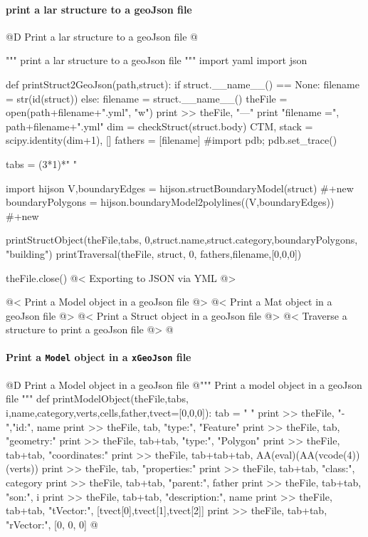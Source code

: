 \documentclass[11pt,oneside]{article}	%
\begin{document}
\paragraph{print a lar structure to a geoJson file}

@D Print a lar structure to a geoJson file
@{""" print a lar structure to a geoJson file """
import yaml
import json

	

def printStruct2GeoJson(path,struct):
	if struct.__name__() == None:
		filename = str(id(struct))
	else: 
		filename = struct.__name__()
	theFile = open(path+filename+".yml", "w")
	print >> theFile, "---"
	print "filename =", path+filename+".yml"
	dim = checkStruct(struct.body)
	CTM, stack = scipy.identity(dim+1), []
	fathers = [filename]
	#import pdb; pdb.set_trace()

	tabs = (3*1)*" "

	import hijson
	V,boundaryEdges = hijson.structBoundaryModel(struct)   #+new
	boundaryPolygons = hijson.boundaryModel2polylines((V,boundaryEdges))  #+new
	
	printStructObject(theFile,tabs, 0,struct.name,struct.category,boundaryPolygons, "building")
	printTraversal(theFile, struct, 0, fathers,filename,[0,0,0]) 

	theFile.close()
	@< Exporting to JSON via YML @>

@< Print a Model object in a geoJson file @>
@< Print a Mat object in a geoJson file @>
@< Print a Struct object in a geoJson file @>
@< Traverse a structure to print a geoJson file @>
@}

\paragraph{Print a \texttt{Model} object in a \texttt{xGeoJson} file}
	
@D Print a Model object in a geoJson file
@{""" Print a model object in a geoJson file """
def printModelObject(theFile,tabs, i,name,category,verts,cells,father,tvect=[0,0,0]):
	tab = "	"
	print >> theFile, "-   ","id:", name
	print >> theFile, tab, "type:", "Feature"
	print >> theFile, tab, "geometry:" 
	print >> theFile, tab+tab, "type:", "Polygon"
	print >> theFile, tab+tab, "coordinates:" 
	print >> theFile, tab+tab+tab, AA(eval)(AA(vcode(4))(verts))
	print >> theFile, tab, "properties:"
	print >> theFile, tab+tab, "class:", category
	print >> theFile, tab+tab, "parent:", father
	print >> theFile, tab+tab, "son:", i
	print >> theFile, tab+tab, "description:", name
	print >> theFile, tab+tab, "tVector:", [tvect[0],tvect[1],tvect[2]]
	print >> theFile, tab+tab, "rVector:", [0, 0, 0]
@}
\end{document}
